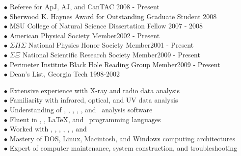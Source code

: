 \documentclass[12pt]{cv}
\begin{document}
\begin{llist}

$\bullet$ Referee for ApJ, AJ, and CanTAC \hfill 2008 - Present\\
$\bullet$ Sherwood K. Haynes Award for Outstanding Graduate Student \hfill 2008\\
$\bullet$ MSU College of Natural Science Dissertation Fellow \hfill 2007 - 2008\\
$\bullet$ American Physical Society Member\hfill 2002 - Present\\
$\bullet$ $\Sigma \Pi \Sigma$ National Physics Honor Society Member\hfill 2001 - Present\\
$\bullet$ $\Sigma \Xi$ National Scientific Research Society Member\hfill 2009 - Present\\
$\bullet$ Perimeter Institute Black Hole Reading Group Member\hfill 2009 - Present\\
$\bullet$ Dean's List, Georgia Tech \hfill 1998-2002


$\bullet$ Extensive experience with X-ray and radio data analysis\\
$\bullet$ Familiarity with infrared, optical, and UV data analysis\\
$\bullet$ Understanding of \aips, \casa, \ciao, \iraf, \osa, and \sas\ analysis software\\
$\bullet$ Fluent in \html, \idl, \LaTeX, and \perl\ programming languages\\
$\bullet$ Worked with \clang, \flash, \fortran, \mysql, \python, \supmo, and \tcl\\
$\bullet$ Mastery of DOS, Linux, Macintosh, and Windows computing architectures\\
$\bullet$ Expert of computer maintenance, system construction, and troubleshooting



\end{llist}
\end{document}
